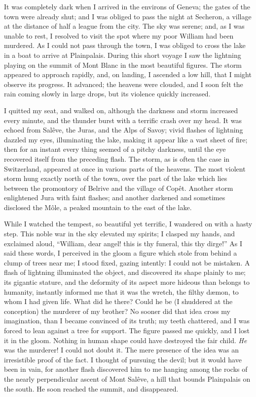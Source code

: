 \documentclass[12pt,openright]{book}
\begin{document}
It was completely dark when I arrived in the environs of Geneva; the gates of the town were already shut; and I was obliged to pass the night at Secheron, a village at the distance of half a league from the city. The sky was serene; and, as I was unable to rest, I resolved to visit the spot where my poor William had been murdered. As I could not pass through the town, I was obliged to cross the lake in a boat to arrive at Plainpalais. During this short voyage I saw the lightning playing on the summit of Mont Blanc in the most beautiful figures. The storm appeared to approach rapidly, and, on landing, I ascended a low hill, that I might observe its progress. It advanced; the heavens were clouded, and I soon felt the rain coming slowly in large drops, but its violence quickly increased.

I quitted my seat, and walked on, although the darkness and storm increased every minute, and the thunder burst with a terrific crash over my head. It was echoed from Salêve, the Juras, and the Alps of Savoy; vivid flashes of lightning dazzled my eyes, illuminating the lake, making it appear like a vast sheet of fire; then for an instant every thing seemed of a pitchy darkness, until the eye recovered itself from the preceding flash. The storm, as is often the case in Switzerland, appeared at once in various parts of the heavens. The most violent storm hung exactly north of the town, over the part of the lake which lies between the promontory of Belrive and the village of Copêt. Another storm enlightened Jura with faint flashes; and another darkened and sometimes disclosed the Môle, a peaked mountain to the east of the lake.

While I watched the tempest, so beautiful yet terrific, I wandered on with a hasty step. This noble war in the sky elevated my spirits; I clasped my hands, and exclaimed aloud, “William, dear angel! this is thy funeral, this thy dirge!” As I said these words, I perceived in the gloom a figure which stole from behind a clump of trees near me; I stood fixed, gazing intently: I could not be mistaken. A flash of lightning illuminated the object, and discovered its shape plainly to me; its gigantic stature, and the deformity of its aspect more hideous than belongs to humanity, instantly informed me that it was the wretch, the filthy dæmon, to whom I had given life. What did he there? Could he be (I shuddered at the conception) the murderer of my brother? No sooner did that idea cross my imagination, than I became convinced of its truth; my teeth chattered, and I was forced to lean against a tree for support. The figure passed me quickly, and I lost it in the gloom. Nothing in human shape could have destroyed the fair child. \textit{He} was the murderer! I could not doubt it. The mere presence of the idea was an irresistible proof of the fact. I thought of pursuing the devil; but it would have been in vain, for another flash discovered him to me hanging among the rocks of the nearly perpendicular ascent of Mont Salêve, a hill that bounds Plainpalais on the south. He soon reached the summit, and disappeared.
\end{document}
